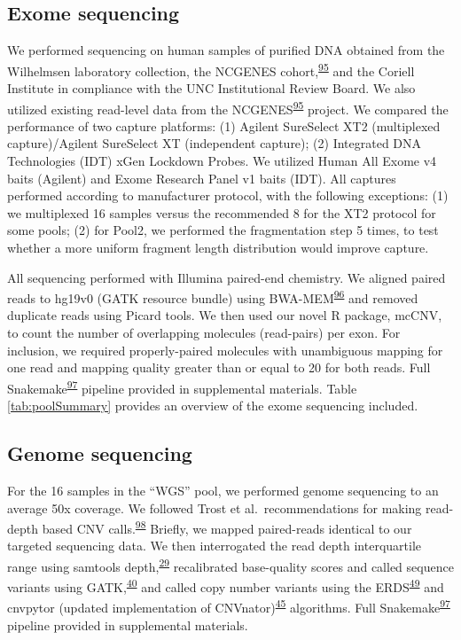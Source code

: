 \documentclass[11pt,letterpaper]{book}
\begin{document}
\hypertarget{exome-sequencing}{%
\subsection{Exome sequencing}\label{exome-sequencing}}

We performed sequencing on human samples of purified DNA obtained from the Wilhelmsen laboratory collection, the NCGENES cohort,\textsuperscript{\protect\hyperlink{ref-foreman:2013aa}{95}} and the Coriell Institute in compliance with the UNC Institutional Review Board.
We also utilized existing read-level data from the NCGENES\textsuperscript{\protect\hyperlink{ref-foreman:2013aa}{95}} project.
We compared the performance of two capture platforms: (1) Agilent SureSelect XT2 (multiplexed capture)/Agilent SureSelect XT (independent capture); (2) Integrated DNA Technologies (IDT) xGen Lockdown Probes.
We utilized Human All Exome v4 baits (Agilent) and Exome Research Panel v1 baits (IDT).
All captures performed according to manufacturer protocol, with the following exceptions: (1) we multiplexed 16 samples versus the recommended 8 for the XT2 protocol for some pools; (2) for Pool2, we performed the fragmentation step 5 times, to test whether a more uniform fragment length distribution would improve capture.

All sequencing performed with Illumina paired-end chemistry.
We aligned paired reads to hg19v0 (GATK resource bundle) using BWA-MEM\textsuperscript{\protect\hyperlink{ref-li:2013ab}{96}} and removed duplicate reads using Picard tools.
We then used our novel R package, mcCNV, to count the number of overlapping molecules (read-pairs) per exon.
For inclusion, we required properly-paired molecules with unambiguous mapping for one read and mapping quality greater than or equal to 20 for both reads.
Full Snakemake\textsuperscript{\protect\hyperlink{ref-koster:2012aa}{97}} pipeline provided in supplemental materials.
Table \ref{tab:poolSummary} provides an overview of the exome sequencing included.

\hypertarget{genome-sequencing}{%
\subsection{Genome sequencing}\label{genome-sequencing}}

For the 16 samples in the ``WGS'' pool, we performed genome sequencing to an average 50x coverage.
We followed Trost et al.~recommendations for making read-depth based CNV calls.\textsuperscript{\protect\hyperlink{ref-trost:2018aa}{98}}
Briefly, we mapped paired-reads identical to our targeted sequencing data.
We then interrogated the read depth interquartile range using samtools depth,\textsuperscript{\protect\hyperlink{ref-li:2009aa}{29}} recalibrated base-quality scores and called sequence variants using GATK,\textsuperscript{\protect\hyperlink{ref-van-der-auwera:2013aa}{40}} and called copy number variants using the ERDS\textsuperscript{\protect\hyperlink{ref-zhu:2012aa}{49}} and cnvpytor (updated implementation of CNVnator)\textsuperscript{\protect\hyperlink{ref-abyzov:2011aa}{45}} algorithms.
Full Snakemake\textsuperscript{\protect\hyperlink{ref-koster:2012aa}{97}} pipeline provided in supplemental materials.
\end{document}
